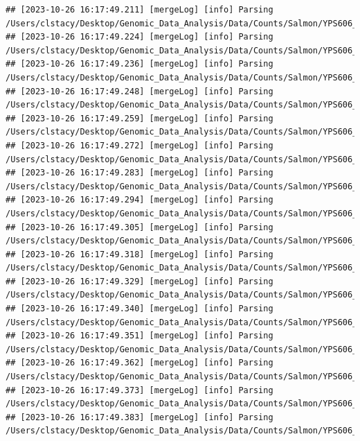 \documentclass[
]{book}
\begin{document}
\begin{verbatim}
## [2023-10-26 16:17:49.211] [mergeLog] [info] Parsing /Users/clstacy/Desktop/Genomic_Data_Analysis/Data/Counts/Salmon/YPS606_MSN24_ETOH_REP1_R1.fastq.gz_quant/quant.sf
## [2023-10-26 16:17:49.224] [mergeLog] [info] Parsing /Users/clstacy/Desktop/Genomic_Data_Analysis/Data/Counts/Salmon/YPS606_MSN24_ETOH_REP2_R1.fastq.gz_quant/quant.sf
## [2023-10-26 16:17:49.236] [mergeLog] [info] Parsing /Users/clstacy/Desktop/Genomic_Data_Analysis/Data/Counts/Salmon/YPS606_MSN24_ETOH_REP3_R1.fastq.gz_quant/quant.sf
## [2023-10-26 16:17:49.248] [mergeLog] [info] Parsing /Users/clstacy/Desktop/Genomic_Data_Analysis/Data/Counts/Salmon/YPS606_MSN24_ETOH_REP4_R1.fastq.gz_quant/quant.sf
## [2023-10-26 16:17:49.259] [mergeLog] [info] Parsing /Users/clstacy/Desktop/Genomic_Data_Analysis/Data/Counts/Salmon/YPS606_MSN24_MOCK_REP1_R1.fastq.gz_quant/quant.sf
## [2023-10-26 16:17:49.272] [mergeLog] [info] Parsing /Users/clstacy/Desktop/Genomic_Data_Analysis/Data/Counts/Salmon/YPS606_MSN24_MOCK_REP2_R1.fastq.gz_quant/quant.sf
## [2023-10-26 16:17:49.283] [mergeLog] [info] Parsing /Users/clstacy/Desktop/Genomic_Data_Analysis/Data/Counts/Salmon/YPS606_MSN24_MOCK_REP3_R1.fastq.gz_quant/quant.sf
## [2023-10-26 16:17:49.294] [mergeLog] [info] Parsing /Users/clstacy/Desktop/Genomic_Data_Analysis/Data/Counts/Salmon/YPS606_MSN24_MOCK_REP4_R1.fastq.gz_quant/quant.sf
## [2023-10-26 16:17:49.305] [mergeLog] [info] Parsing /Users/clstacy/Desktop/Genomic_Data_Analysis/Data/Counts/Salmon/YPS606_WT_ETOH_REP1_R1.fastq.gz_quant/quant.sf
## [2023-10-26 16:17:49.318] [mergeLog] [info] Parsing /Users/clstacy/Desktop/Genomic_Data_Analysis/Data/Counts/Salmon/YPS606_WT_ETOH_REP2_R1.fastq.gz_quant/quant.sf
## [2023-10-26 16:17:49.329] [mergeLog] [info] Parsing /Users/clstacy/Desktop/Genomic_Data_Analysis/Data/Counts/Salmon/YPS606_WT_ETOH_REP3_R1.fastq.gz_quant/quant.sf
## [2023-10-26 16:17:49.340] [mergeLog] [info] Parsing /Users/clstacy/Desktop/Genomic_Data_Analysis/Data/Counts/Salmon/YPS606_WT_ETOH_REP4_R1.fastq.gz_quant/quant.sf
## [2023-10-26 16:17:49.351] [mergeLog] [info] Parsing /Users/clstacy/Desktop/Genomic_Data_Analysis/Data/Counts/Salmon/YPS606_WT_MOCK_REP1_R1.fastq.gz_quant/quant.sf
## [2023-10-26 16:17:49.362] [mergeLog] [info] Parsing /Users/clstacy/Desktop/Genomic_Data_Analysis/Data/Counts/Salmon/YPS606_WT_MOCK_REP2_R1.fastq.gz_quant/quant.sf
## [2023-10-26 16:17:49.373] [mergeLog] [info] Parsing /Users/clstacy/Desktop/Genomic_Data_Analysis/Data/Counts/Salmon/YPS606_WT_MOCK_REP3_R1.fastq.gz_quant/quant.sf
## [2023-10-26 16:17:49.383] [mergeLog] [info] Parsing /Users/clstacy/Desktop/Genomic_Data_Analysis/Data/Counts/Salmon/YPS606_WT_MOCK_REP4_R1.fastq.gz_quant/quant.sf

\end{verbatim}
\end{document}
